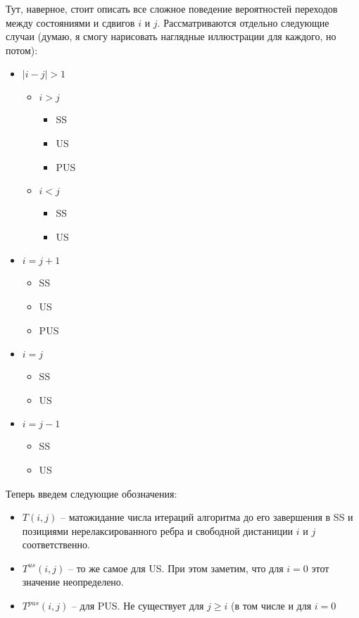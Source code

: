\documentclass[a4paper,10pt]{article}
\begin{document}
Тут, наверное, стоит описать все сложное поведение вероятностей переходов между состояниями и сдвигов $i$ и $j$. Рассматриваются отдельно следующие случаи (думаю, я смогу нарисовать наглядные иллюстрации для каждого, но потом):
\begin{itemize}
 \item $|i - j| > 1$
 \begin{itemize}
  \item $i > j$
  \begin{itemize}
   \item SS
   \item US
   \item PUS
  \end{itemize}
  \item $i < j$
  \begin{itemize}
   \item SS
   \item US
  \end{itemize}
 \end{itemize}
 \item $ i = j + 1$
  \begin{itemize}
   \item SS
   \item US
   \item PUS
  \end{itemize}
 \item $i = j$
  \begin{itemize}
   \item SS
   \item US
  \end{itemize}
 \item $i = j - 1$
  \begin{itemize}
   \item SS
   \item US
  \end{itemize}
\end{itemize}

Теперь введем следующие обозначения:
\begin{itemize}
 \item $T(i,j)$ -- матожидание числа итераций алгоритма до его завершения в SS и позициями нерелаксированного ребра и свободной дистаниции $i$ и $j$ соответственно.
 \item $T^{us}(i, j)$ -- то же самое для US. При этом заметим, что для $i = 0$ этот значение неопределено.
 \item $T^{pus}(i, j)$  -- для PUS. Не существует для $j \ge i$ (в том числе и для $i = 0$
\end{itemize}
\end{document}
